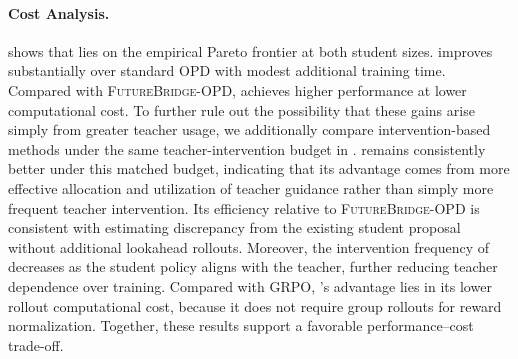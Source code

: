 \vspace{-0.5em}
\paragraph{Cost Analysis.}
 shows that \name lies on the empirical Pareto frontier at both student sizes.
\name improves substantially over standard OPD with modest additional training time. 
Compared with \textsc{FutureBridge-OPD}, \name achieves higher performance at lower computational cost. 
To further rule out the possibility that these gains arise simply from greater teacher usage, we additionally compare intervention-based methods under the same teacher-intervention budget in .
\name remains consistently better under this matched budget, indicating that its advantage comes from more effective allocation and utilization of teacher guidance rather than simply more frequent teacher intervention.
Its efficiency relative to \textsc{FutureBridge-OPD} is consistent with estimating discrepancy from the existing student proposal without additional lookahead rollouts. 
Moreover, the intervention frequency of \name decreases as the student policy aligns with the teacher, further reducing teacher dependence over training. 
Compared with \textsc{GRPO}, \name's advantage lies in its lower rollout computational cost, because it does not require group rollouts for reward normalization.
Together, these results support a favorable performance--cost trade-off.
